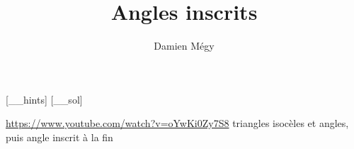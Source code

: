 



\def\bio{}


\newcommand{\deuxSecantes}{
\tkzDefPoint(0,0){O}
\tkzDrawCircle(O,A)
\tkzInterLL(B,C)(A,D)\tkzGetPoint{P}
\tkzDrawSegments(P,A P,B)
\tkzDrawPolygon[very thick](A,B,C,D)
}

\newcommand{\quatreSecantes}{
\tkzDefPoint(0,0){O}
\tkzDrawCircle(O,A)
\tkzInterLL(B,C)(A,D)\tkzGetPoint{P}
\tkzInterLL(A,B)(C,D)\tkzGetPoint{Q}
\tkzDrawSegments(P,C P,D Q,B Q,C)
\tkzDrawPolygon[very thick](A,B,C,D)
}




[_\jobname_hints]
[_\jobname_sol]


\title{Angles inscrits}
\author{Damien Mégy}
\maketitle

\avertissement 

\url{https://www.youtube.com/watch?v=oYwKi0Zy7S8} triangles isocèles et angles, puis angle inscrit à la fin





\indications
\correction



